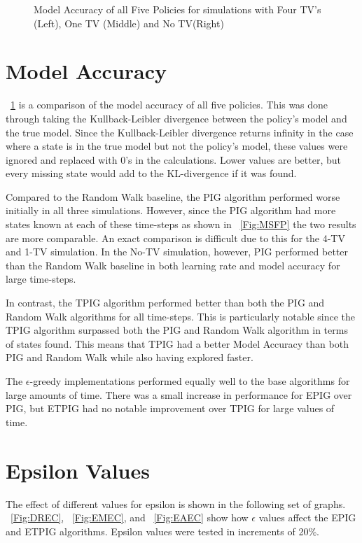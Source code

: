 \documentclass[12pt]{thesis}
\begin{document}
\begin{figure}
\begin{center}
	\end{center}
	\caption{Model Accuracy of all Five Policies for simulations with Four TV's (Left), One TV (Middle) and No TV(Right)}
	\label{Fig:MAFP}
\end{figure}

\section{Model Accuracy}
\figurename~\ref{Fig:MAFP} is a comparison of the model accuracy of all five policies. This was done through taking the Kullback-Leibler divergence between the policy's model and the true model. Since the Kullback-Leibler divergence returns infinity in the case where a state is in the true model but not the policy's model, these values were ignored and replaced with 0's in the calculations. Lower values are better, but every missing state would add to the KL-divergence if it was found.

Compared to the Random Walk baseline, the PIG algorithm performed worse initially in all three simulations. However, since the PIG algorithm had more states known at each of these time-steps as shown in \figurename~\ref{Fig:MSFP} the two results are more comparable. An exact comparison is difficult due to this for the 4-TV and 1-TV simulation. In the No-TV simulation, however, PIG performed better than the Random Walk baseline in both learning rate and model accuracy for large time-steps.

In contrast, the TPIG algorithm performed better than both the PIG and Random Walk algorithms for all time-steps. This is particularly notable since the TPIG algorithm surpassed both the PIG and Random Walk algorithm in terms of states found. This means that TPIG had a better Model Accuracy than both PIG and Random Walk while also having explored faster.

The $\epsilon$-greedy implementations performed equally well to the base algorithms for large amounts of time. There was a small increase in performance for EPIG over PIG, but ETPIG had no notable improvement over TPIG for large values of time.



\section{Epsilon Values}
The effect of different values for epsilon is shown in the following set of graphs. \figurename~\ref{Fig:DREC}, \figurename~\ref{Fig:EMEC}, and \figurename~\ref{Fig:EAEC} show how $\epsilon$ values affect the EPIG and ETPIG algorithms. Epsilon values were tested in increments of 20\%.
\end{document}
